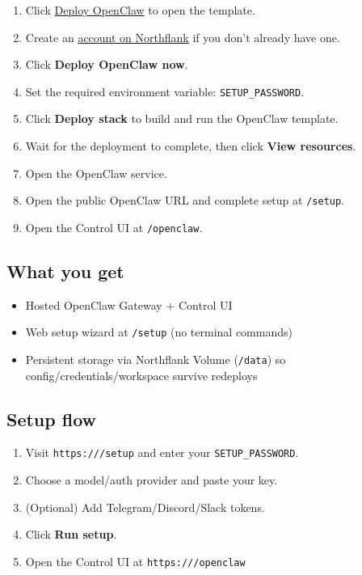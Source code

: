 \begin{enumerate}
  \item Click \href{https://northflank.com/stacks/deploy-openclaw}{Deploy OpenClaw} to open the template.
  \item Create an \href{https://app.northflank.com/signup}{account on Northflank} if you don’t already have one.
  \item Click \textbf{Deploy OpenClaw now}.
  \item Set the required environment variable: \texttt{SETUP\_PASSWORD}.
  \item Click \textbf{Deploy stack} to build and run the OpenClaw template.
  \item Wait for the deployment to complete, then click \textbf{View resources}.
  \item Open the OpenClaw service.
  \item Open the public OpenClaw URL and complete setup at \texttt{/setup}.
  \item Open the Control UI at \texttt{/openclaw}.
\end{enumerate}


\subsection{What you get}


\begin{itemize}
  \item Hosted OpenClaw Gateway + Control UI
  \item Web setup wizard at \texttt{/setup} (no terminal commands)
  \item Persistent storage via Northflank Volume (\texttt{/data}) so config/credentials/workspace survive redeploys
\end{itemize}


\subsection{Setup flow}


\begin{enumerate}
  \item Visit \texttt{https:///setup} and enter your \texttt{SETUP\_PASSWORD}.
  \item Choose a model/auth provider and paste your key.
  \item (Optional) Add Telegram/Discord/Slack tokens.
  \item Click \textbf{Run setup}.
  \item Open the Control UI at \texttt{https:///openclaw}
\end{enumerate}


